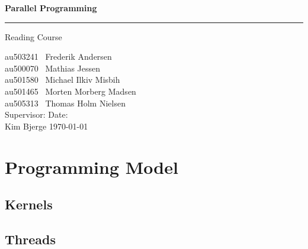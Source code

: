 \documentclass[12px,oz]{report}
\begin{document}
	
	\begin{titlepage}
		\centering
		\vspace*{3\baselineskip}
		{\Huge \bfseries Parallel Programming}
		\rule{\linewidth}{0.5mm}
		\LARGE
		Reading Course
		\\
		\null\vfill
		\begin{flushleft} \large
			au503241 \hspace*{2em} \  Frederik Andersen\\
			au500070 \hspace*{2em} \  Mathias Jessen\\
			au501580 \hspace*{2em} \  Michael Ilkiv Misbih\\
			au501465 \hspace*{2em} \  Morten Morberg Madsen\\
			au505313 \hspace*{2em} \  Thomas Holm Nielsen\\
			\vspace{100pt}
			Supervisor:\hspace{94pt}  Date: \\
			Kim Bjerge \hspace{90pt}  \today\\
		\end{flushleft}
		\vspace*{6\baselineskip}
	\end{titlepage}

\tableofcontents
\clearpage
{}
\cleardoublepage

\chapter{Programming Model}
\label{ch-programming-model}


	\section{Kernels}
	\label{sec-pm-kernels}
	

	\section{Threads}
	\label{sec-pm-threads}
	
	
\end{document}
